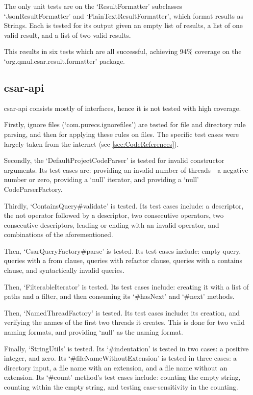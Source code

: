 \documentclass[12pt, letterpaper]{article}
\begin{document}
The only unit tests are on the `ResultFormatter' subclasses `JsonResultFormatter' and `PlainTextResultFormatter', which format results as Strings.
Each is tested for its output given an empty list of results, a list of one valid result, and a list of two valid results.

This results in six tests which are all successful, achieving 94\% coverage on the `org.qmul.csar.result.formatter' package.

\subsection{csar-api}
csar-api consists mostly of interfaces, hence it is not tested with high coverage.

Firstly, ignore files (`com.purecs.ignorefiles') are tested for file and directory rule parsing, and then for applying these rules on files.
The specific test cases were largely taken from the internet (see \ref{sec:CodeReferences}).

Secondly, the `DefaultProjectCodeParser' is tested for invalid constructor arguments.
Its test cases are: providing an invalid number of threads - a negative number or zero, providing a `null' iterator, and providing a `null' CodeParserFactory.

Thirdly, `ContainsQuery\#validate' is tested.
Its test cases include: a descriptor, the not operator followed by a descriptor, two consecutive operators, two consecutive descriptors, leading or ending with an invalid operator, and combinations of the aforementioned.

Then, `CsarQueryFactory\#parse' is tested.
Its test cases include: empty query, queries with a from clause, queries with refactor clause, queries with a contains clause, and syntactically invalid queries.

Then, `FilterableIterator' is tested.
Its test cases include: creating it with a list of paths and a filter, and then consuming its `\#hasNext' and `\#next' methods.

Then, `NamedThreadFactory' is tested.
Its test cases include: its creation, and verifying the names of the first two threads it creates.
This is done for two valid naming formats, and providing `null' as the naming format.

Finally, `StringUtils' is tested.
Its `\#indentation' is tested in two cases: a positive integer, and zero.
Its `\#fileNameWithoutExtension' is tested in three cases: a directory input, a file name with an extension, and a file name without an extension.
Its `\#count' method's test cases include: counting the empty string, counting within the empty string, and testing case-sensitivity in the counting.
\end{document}
